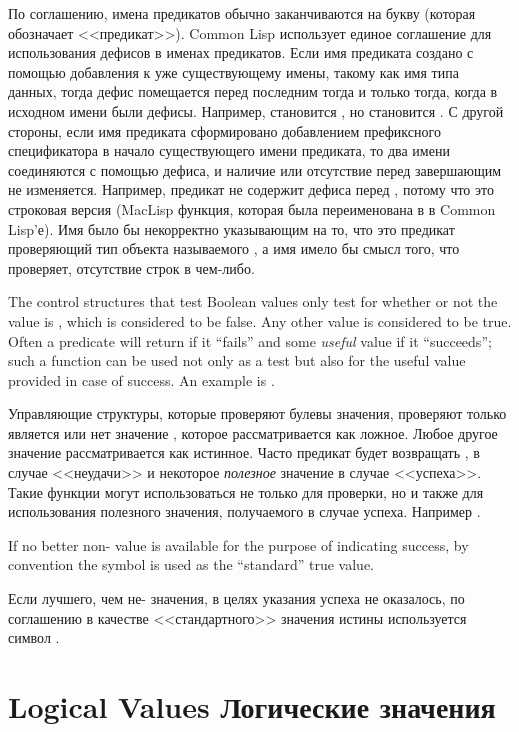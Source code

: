 По соглашению, имена предикатов обычно заканчиваются на букву  (которая
обозначает <<предикат>>).
Common Lisp использует единое соглашение для использования дефисов в именах
предикатов. Если имя предиката создано с помощью добавления  к уже
существующему имены, такому как имя типа данных, тогда дефис помещается перед
последним  тогда и только тогда, когда в исходном имени были
дефисы. Например,  становится , но 
становится .
С другой стороны, если имя предиката сформировано добавлением префиксного
спецификатора в начало существующего имени предиката, то два имени соединяются с
помощью дефиса, и наличие или отсутствие перед завершающим  не
изменяется. Например, предикат  не содержит дефиса перед
, потому что это строковая версия  (MacLisp функция, которая
была переименована в \cdf{<} в Common Lisp'е). Имя  было бы
некорректно указывающим на то, что это предикат проверяющий тип объекта
называемого , а имя  имело бы смысл того, что
проверяет, отсутствие строк в чем-либо. 

The control structures that test Boolean values only test for
whether or not the value is {\false}, which is considered to be false.  Any
other value is considered to be true.  Often a predicate will return {\false} if
it ``fails'' and some \emph{useful} value if it ``succeeds'';
such a function can be used not only as a test but
also for the useful value provided in case of success.  An example
is .

Управляющие структуры, которые проверяют булевы значения, проверяют только
является или нет значение {\false}, которое рассматривается как ложное. Любое
другое значение рассматривается как истинное. Часто предикат будет возвращать
{\false}, в случае <<неудачи>> и некоторое \emph{полезное} значение в случае
<<успеха>>. Такие функции могут использоваться не только для проверки, но и
также для использования полезного значения, получаемого в случае
успеха. Например .

If no better non-{\nil} value is available for the purpose of indicating
success, by convention the symbol  is used as the ``standard''
true value.

Если лучшего, чем не-{\nil} значения, в целях указания успеха не оказалось, по
соглашению в качестве <<стандартного>> значения истины используется символ .

\section{Logical Values Логические значения}

